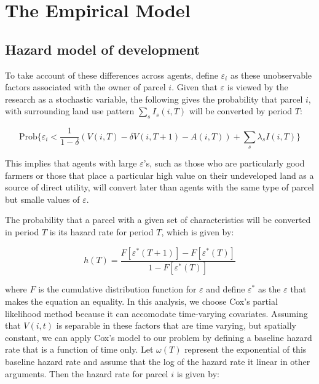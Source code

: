 \section{The Empirical Model}

\subsection{Hazard model of development}

To take account of these differences across agents, define $\varepsilon_i$ as these unobservable factors associated with the owner of parcel $i$. Given that $\varepsilon$ is viewed by the research as a stochastic variable, the following gives the probability that parcel $i$, with surrounding land use pattern $\sum_s I_s(i, T)$ will be converted by period $T$:

\begin{equation}
    \text{Prob} \{\varepsilon_i < \frac{1}{1 - \delta} (V(i, T) - \delta V(i, T + 1) - A(i, T)) + \sum_s \lambda_s I(i, T)\}
\end{equation}

This implies that agents with large $\varepsilon$'s, such as those who are particularly good farmers or those that place a particular high value on their undeveloped land as a source of direct utility, will convert later than agents with the same type of parcel but smalle values of $\varepsilon$.

The probability that a parcel with a given set of characteristics will be converted in period $T$ is its hazard rate for period $T$, which is given by:

\begin{equation}
    h(T) = \frac{F[\varepsilon^*(T + 1)] - F[\varepsilon^*(T)]}{1 - F[\varepsilon^*(T)]}
\end{equation}

where $F$ is the cumulative distribution function for $\varepsilon$ and define $\varepsilon^*$ as the $\varepsilon$ that makes the equation an equality. In this analysis, we choose Cox's partial likelihood method because it can accomodate time-varying covariates. Assuming that $V(i, t)$ is separable in these factors that are time varying, but spatially constant, we can apply Cox's model to our problem by defining a baseline hazard rate that is a function of time only. Let $\omega(T)$ represent the exponential of this baseline hazard rate and assume that the log of the hazard rate it linear in other arguments. Then the hazard rate for parcel $i$ is given by:

